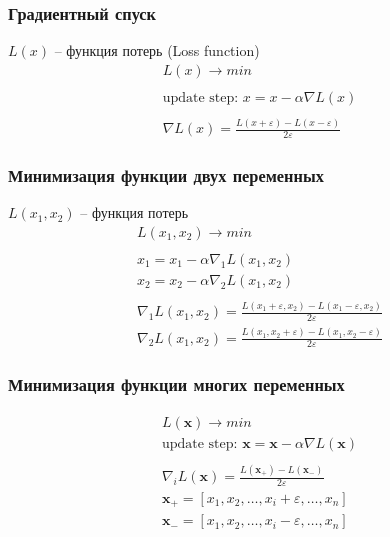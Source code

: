 \documentclass[fullscreen=true, bookmarks=false]{beamer} %
\begin{document}

\begin{frame}{}
 \frametitle{Градиентный спуск}
$L(x)$ -- функция потерь (Loss function) 
\begin{gather*}
\nonumber
L(x) \rightarrow min\\
\nonumber\\
\nonumber
\text{update step: } x = x - \alpha \nabla L(x)\\
\nonumber\\
\nonumber
\nabla L(x) = \frac{L(x+\varepsilon) - L(x - \varepsilon)}{2\varepsilon}
\end{gather*}

\end{frame}


\begin{frame}{}
 \frametitle{Минимизация функции двух переменных}
$L(x_1, x_2)$ -- функция потерь 
\begin{gather*}
\nonumber
L(x_1, x_2) \rightarrow min\\
\nonumber\\
\nonumber
x_1 = x_1 - \alpha \nabla_1 L(x_1, x_2)\\
\nonumber
x_2 = x_2 - \alpha \nabla_2 L(x_1, x_2)\\
\nonumber\\
\nonumber
\nabla_1 L(x_1, x_2) = \frac{L(x_1+\varepsilon, x_2) - L(x_1 - \varepsilon, x_2)}{2\varepsilon}\\
\nonumber
\nabla_2 L(x_1, x_2) = \frac{L(x_1, x_2+\varepsilon) - L(x_1 , x_2 - \varepsilon)}{2\varepsilon}
\end{gather*}

\end{frame}


\begin{frame}{}
 \frametitle{Минимизация функции многих переменных}
\begin{gather*}
\nonumber
L(\bm{x}) \rightarrow min\\
\nonumber
\text{update step: } \bm{x} = \bm{x} - \alpha \nabla L(\bm{x})\\
\nonumber
\nonumber\\
\nonumber
\nabla_i L(\bm{x}) = \frac{L(\bm{x}_+) - L(\bm{x}_-)}{2\varepsilon}\\
\nonumber
\bm{x}_+ = [x_1, x_2, \ldots, x_i+\varepsilon, \ldots, x_n]\\
\bm{x}_- = [x_1, x_2, \ldots, x_i-\varepsilon, \ldots, x_n]
\end{gather*}

\end{frame}
\end{document}
